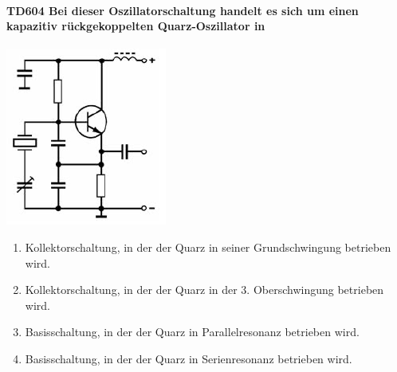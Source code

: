 \documentclass[8pt]{article}
\begin{document}
\begin{enumerate}
\begin{enumerate}[nolistsep,label=\Alph*]
\paragraph*{TD604 Bei dieser Oszillatorschaltung handelt es sich um einen kapazitiv rückgekoppelten Quarz-Oszillator in}
\begin{center}
	\begin{minipage}{\linewidth}
		\centering
		\includegraphics[scale=1.0]{pics/td604_a.jpg}
	\end{minipage}
\end{center}
\begin{enumerate}[nolistsep,label=\Alph*]
\item Kollektorschaltung, in der der Quarz in seiner Grundschwingung betrieben wird.
\item Kollektorschaltung, in der der Quarz in der 3. Oberschwingung betrieben wird.
\item Basisschaltung, in der der Quarz in Parallelresonanz betrieben wird.
\item Basisschaltung, in der der Quarz in Serienresonanz betrieben wird.
\end{enumerate}


\end{enumerate}
\end{enumerate}
\end{document}
